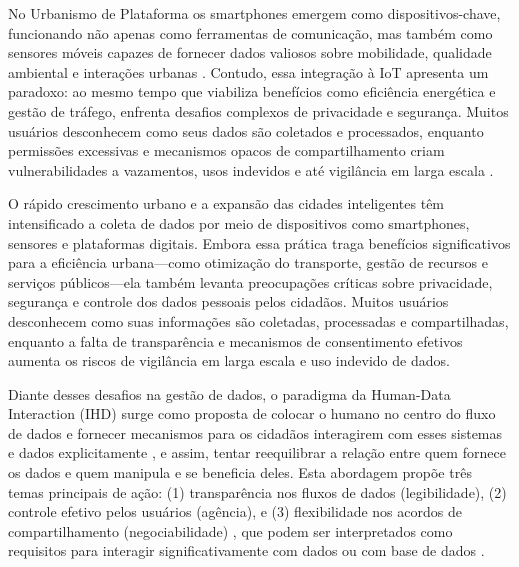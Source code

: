 \documentclass[
	12pt,				%
	oneside,			%
	a4paper,			%
	english,			%
	brazil				%
	]{abntex2ppgsi}
\begin{document}
   No Urbanismo de Plataforma os smartphones emergem como dispositivos-chave, funcionando não apenas como ferramentas de comunicação, mas também como sensores móveis capazes de fornecer dados valiosos sobre mobilidade, qualidade ambiental e interações urbanas \cite{Rose}. Contudo, essa integração à IoT apresenta um paradoxo: ao mesmo tempo que viabiliza benefícios como eficiência energética e gestão de tráfego, enfrenta desafios complexos de privacidade e segurança. Muitos usuários desconhecem como seus dados são coletados e processados\cite{Whaiduzzaman}, enquanto permissões excessivas e mecanismos opacos de compartilhamento criam vulnerabilidades a vazamentos, usos indevidos e até vigilância em larga escala \cite{Whaiduzzaman}.

   O rápido crescimento urbano e a expansão das cidades inteligentes têm intensificado a coleta de dados por meio de dispositivos como smartphones, sensores e plataformas digitais. Embora essa prática traga benefícios significativos para a eficiência urbana---como otimização do transporte, gestão de recursos e serviços públicos---ela também levanta preocupações críticas sobre privacidade, segurança e controle dos dados pessoais pelos cidadãos. Muitos usuários desconhecem como suas informações são coletadas, processadas e compartilhadas, enquanto a falta de transparência e mecanismos de consentimento efetivos aumenta os riscos de vigilância em larga escala e uso indevido de dados.
   
   Diante desses desafios na gestão de dados, o paradigma da Human-Data Interaction (IHD) surge como proposta de colocar o humano no centro do fluxo de dados e fornecer mecanismos para os cidadãos interagirem com esses sistemas e dados explicitamente \cite{mortier2015humandatainteractionhumanface}, e assim, tentar reequilibrar a relação entre quem fornece os dados e quem manipula e se beneficia deles. Esta abordagem propõe três temas principais de ação: (1) transparência nos fluxos de dados (legibilidade), (2) controle efetivo pelos usuários (agência), e (3) flexibilidade nos acordos de compartilhamento (negociabilidade) \cite{mortier2015humandatainteractionhumanface}, que podem ser interpretados como requisitos para interagir significativamente com dados ou com base de dados \cite{Hornung}.
   

       
\end{document}
